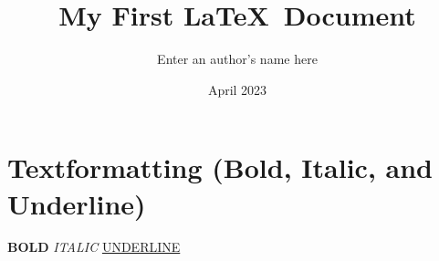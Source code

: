 \documentclass[11pt, a4paper]{article}
\title{My First \LaTeX\ Document}
\author{Enter an author’s name here} %
\date{April 2023}
\begin{document}
	\maketitle
	
	\section*{Textformatting (Bold, Italic, and Underline)}
	\textbf{BOLD} \textit{ITALIC} \underline{UNDERLINE}
	
\end{document}
